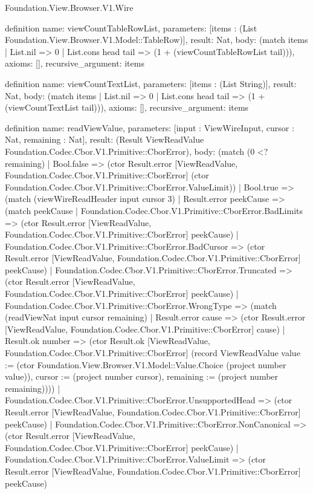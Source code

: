 \begin{lexlean}{Foundation.View.Browser.V1.Wire}
\begin{semanticmodule}
definition{
  name: viewCountTableRowList,
  parameters: [items : (List Foundation.View.Browser.V1.Model::TableRow)],
  result: Nat,
  body: (match items | List.nil => 0 | List.cons head tail => (1 + (viewCountTableRowList tail))),
  axioms: [],
  recursive_argument: items
}

definition{
  name: viewCountTextList,
  parameters: [items : (List String)],
  result: Nat,
  body: (match items | List.nil => 0 | List.cons head tail => (1 + (viewCountTextList tail))),
  axioms: [],
  recursive_argument: items
}

definition{
  name: readViewValue,
  parameters: [input : ViewWireInput, cursor : Nat, remaining : Nat],
  result: (Result ViewReadValue Foundation.Codec.Cbor.V1.Primitive::CborError),
  body: (match (0 <? remaining)
    | Bool.false => (ctor Result.error [ViewReadValue, Foundation.Codec.Cbor.V1.Primitive::CborError] (ctor Foundation.Codec.Cbor.V1.Primitive::CborError.ValueLimit))
    | Bool.true => (match (viewWireReadHeader input cursor 3)
      | Result.error peekCause => (match peekCause
        | Foundation.Codec.Cbor.V1.Primitive::CborError.BadLimits => (ctor Result.error [ViewReadValue, Foundation.Codec.Cbor.V1.Primitive::CborError] peekCause)
        | Foundation.Codec.Cbor.V1.Primitive::CborError.BadCursor => (ctor Result.error [ViewReadValue, Foundation.Codec.Cbor.V1.Primitive::CborError] peekCause)
        | Foundation.Codec.Cbor.V1.Primitive::CborError.Truncated => (ctor Result.error [ViewReadValue, Foundation.Codec.Cbor.V1.Primitive::CborError] peekCause)
        | Foundation.Codec.Cbor.V1.Primitive::CborError.WrongType => (match (readViewNat input cursor remaining)
          | Result.error cause => (ctor Result.error [ViewReadValue, Foundation.Codec.Cbor.V1.Primitive::CborError] cause)
          | Result.ok number => (ctor Result.ok [ViewReadValue, Foundation.Codec.Cbor.V1.Primitive::CborError] (record ViewReadValue {value := (ctor Foundation.View.Browser.V1.Model::Value.Choice (project number value)), cursor := (project number cursor), remaining := (project number remaining)})))
        | Foundation.Codec.Cbor.V1.Primitive::CborError.UnsupportedHead => (ctor Result.error [ViewReadValue, Foundation.Codec.Cbor.V1.Primitive::CborError] peekCause)
        | Foundation.Codec.Cbor.V1.Primitive::CborError.NonCanonical => (ctor Result.error [ViewReadValue, Foundation.Codec.Cbor.V1.Primitive::CborError] peekCause)
        | Foundation.Codec.Cbor.V1.Primitive::CborError.ValueLimit => (ctor Result.error [ViewReadValue, Foundation.Codec.Cbor.V1.Primitive::CborError] peekCause)
}
\end{semanticmodule}
\end{lexlean}
